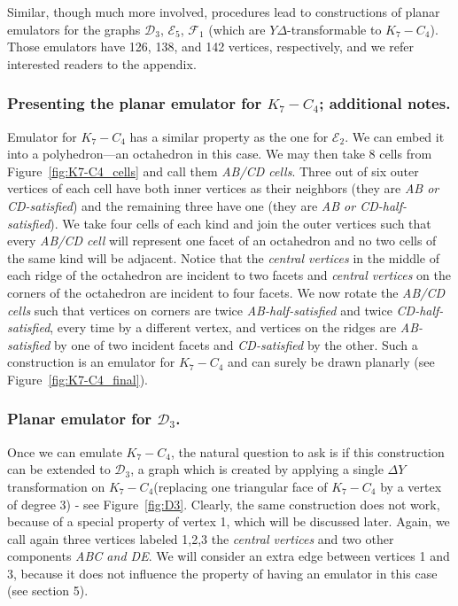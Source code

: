 \documentclass[envcountsect,envcountsame]{llncs}
\renewenvironment{accumulate}{}{}
\newenvironment{onlynoaccum}{}{}
\newcommand{\KK}{\ensuremath{{K}_7 - C_4}\xspace}
\newcommand{\DD}{\ensuremath{\mathcal{D}_3}\xspace}
\newcommand{\EEE}{\ensuremath{\mathcal{E}_5}\xspace}
\newcommand{\FF}{\ensuremath{\mathcal{F}_1}\xspace}
\newcommand{\EE}{\ensuremath{\mathcal{E}_2}\xspace}
\begin{document}
\begin{onlynoaccum}
Similar, though much more involved, procedures lead to constructions
of planar emulators for the graphs \DD, \EEE, \FF
(which are $Y\!\Delta$-transformable to \KK).
Those emulators have 126, 138, and 142 vertices, respectively,
and we refer interested readers to the appendix.
\end{onlynoaccum}


\begin{accumulate}
\subsubsection*{Presenting the planar emulator for \KK; additional notes.}

Emulator for \KK has a similar property as the one for \EE. We can
embed it into a polyhedron---an octahedron in this case.  We may then
 take 8 cells from Figure~\ref{fig:K7-C4_cells} and call
them \textit{AB/CD cells}.  Three out of six outer vertices of each cell
have both inner vertices as their neighbors (they are \textit{AB or
CD-satisfied}) and the remaining three have one (they are \textit{AB or
CD-half-satisfied}).  We take four cells of each kind and join the outer
vertices such that every \textit{AB/CD cell} will represent one facet of an
octahedron and no two cells of the same kind will be adjacent.  Notice that
the \textit{central vertices} in the middle of each ridge of the octahedron
are incident to two facets and \textit{central vertices} on the corners of
the octahedron are incident to four facets.  We now rotate the \textit{AB/CD
cells} such that vertices on corners are twice \textit{AB-half-satisfied}
and twice \textit{CD-half-satisfied}, every time by a different vertex, and
vertices on the ridges are \textit{AB-satisfied} by one of two incident
facets and \textit{CD-satisfied} by the other.  Such a construction is an
emulator for \KK and can surely be drawn planarly (see
Figure~\ref{fig:K7-C4_final}).



\subsubsection{Planar emulator for \DD.}

Once we can emulate \KK, the natural question to ask is if this construction
can be extended to \DD, a graph which is created by applying a single
{\ensuremath{\Delta Y}} transformation on \KK (replacing one triangular face
of \KK by a vertex of degree 3) - see Figure~\ref{fig:D3}.  Clearly, the
same construction does not work, because of a special property of
vertex 1, which will be discussed later.  Again, we call again three vertices
labeled 1,2,3 the \textit{central vertices} and two other components
\textit{ABC and DE}.  We will consider an extra edge between
vertices 1 and 3, because it does not influence the property of having an
emulator in this case (see section 5).



\end{accumulate}
\end{document}
